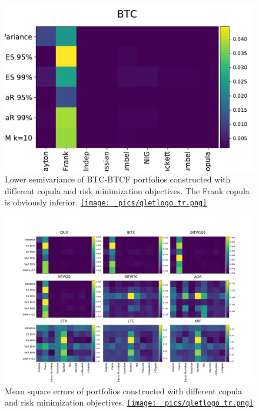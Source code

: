 \begin{figure}[th]
    \centering
    \includegraphics[width=\textwidth]{_pics/semiLowerVariance_BTC.pdf}
  \caption{Lower semivariance of BTC-BTCF portfolios constructed with different copula and risk minimization objectives.
  The Frank copula is obviously inferior.
  \href{http://www.quantlet.com/}{\texttt{[image: \_pics/qletlogo\_tr.png]}} }
\label{fig:SLV_BTC}
\end{figure}

\begin{figure}[th]
    \centering
    \includegraphics[width=\textwidth]{_pics/MSE_other.pdf}
  \caption{Mean square errors of portfolios constructed with different copula and risk minimization objectives.
  \href{http://www.quantlet.com/}{\texttt{[image: \_pics/qletlogo\_tr.png]}} }
\label{fig:MSE_other}
\end{figure}

